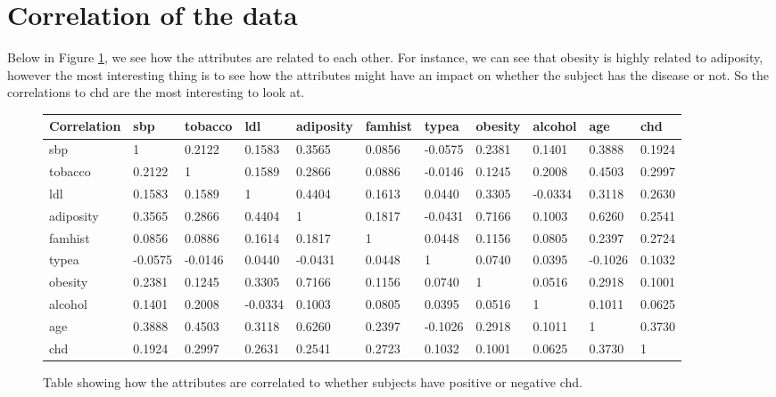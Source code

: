 \section{Correlation of the data}

Below in Figure \ref{correlationTable}, we see how the attributes are related to each other. For instance, we can see that obesity is highly related to adiposity, however the most interesting thing is to see how the attributes might have an impact on whether the subject has the disease or not. So the correlations to chd are the most interesting to look at.

\begin{figure}[H]
\begin{tabular}{ | l | l | l | l | l | l | l | l | l | l | l | }
  \hline                        
  Correlation & sbp & tobacco & ldl & adiposity & famhist & typea & obesity & alcohol & age & chd	\\ \hline
sbp & 1 & 0.2122 & 0.1583 & 0.3565 &  0.0856 & -0.0575 &
   0.2381 & 0.1401 &  0.3888 & 0.1924 \\ \hline
   
 tobacco & 0.2122 & 1 & 0.1589 &  0.2866 &  0.0886 & -0.0146 &
   0.1245 &  0.2008 & 0.4503 &  0.2997 \\ \hline
   
ldl & 0.1583 & 0.1589 &  1 &          0.4404 &  0.1613 &  0.0440 &
   0.3305 &  -0.0334 &   0.3118 & 0.2630 \\ \hline

adiposity &  0.3565 & 0.2866 & 0.4404 & 1 &          0.1817 & -0.0431
 &  0.7166 &  0.1003 &  0.6260 & 0.2541 \\ \hline

famhist & 0.0856 & 0.0886 &  0.1614 &  0.1817 &  1      &    0.0448 &
   0.1156 & 0.0805 &  0.2397 &  0.2724 \\ \hline

typea & -0.0575 & -0.0146 &  0.0440 & -0.0431 &  0.0448 &  1 &
   0.0740 &   0.0395 & -0.1026 &  0.1032 \\ \hline

obesity & 0.2381 &  0.1245 &  0.3305 &  0.7166 &  0.1156 &  0.0740 &
   1 &          0.0516 &  0.2918 &  0.1001 \\ \hline

alcohol & 0.1401 & 0.2008 & -0.0334 &   0.1003 &  0.0805 &  0.0395 &
   0.0516 &  1 &          0.1011 &  0.0625 \\ \hline

age & 0.3888 &  0.4503 &  0.3118 &  0.6260 & 0.2397 & -0.1026 &
   0.2918 &  0.1011 &  1     &     0.3730  \\ \hline
  
  
chd &  0.1924 & 0.2997 & 0.2631 & 0.2541 & 0.2723 & 0.1032 & 0.1001 & 0.0625 & 0.3730 & 1 \\ \hline
\end{tabular}
\caption{Table showing how the attributes are correlated to whether subjects have positive or negative chd.}
\label{correlationTable}
\end{figure}

